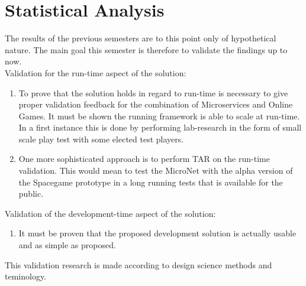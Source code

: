 \section{Statistical Analysis}

The results of the previous semesters are to this point only of hypothetical
nature. The main goal this semester is therefore to validate the findings up to
now.\\

Validation for the run-time aspect of the solution:

\begin{enumerate}
  \item To prove that the solution holds in regard to run-time is necessary to
  give proper validation feedback for the combination of Microservices and
  Online Games. It must be shown the running framework is able to scale at
  run-time. In a first instance this is done by performing lab-research in the
  form of small scale play test with some elected test players.
  \item One more sophisticated approach is to perform TAR on the run-time
  validation. This would mean to test the MicroNet with the alpha version of the
  Spacegame prototype in a long running tests that is available for the public. 
\end{enumerate}

Validation of the development-time aspect of the solution:

\begin{enumerate}
  \item It must be proven that the proposed development solution is actually
  usable and as simple as proposed.
\end{enumerate}

This validation research is made according to design science methods and
teminology.